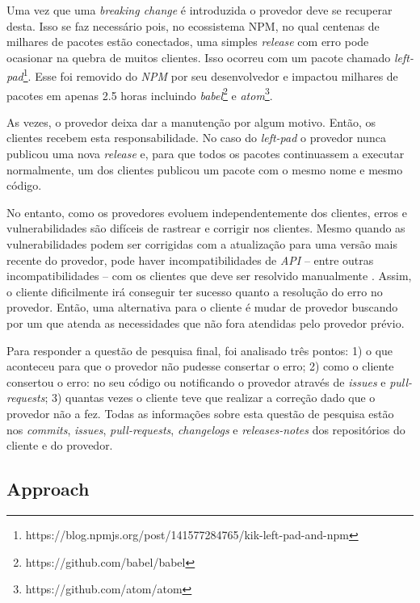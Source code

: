 Uma vez que uma \textit{breaking change} é introduzida o provedor deve se recuperar desta. Isso se faz necessário pois, no ecossistema \gls{NPM}, no qual centenas de milhares de pacotes estão conectados, uma simples \textit{release} com erro pode ocasionar na quebra de muitos clientes. Isso ocorreu com um pacote chamado \textit{left-pad}\footnote{https://blog.npmjs.org/post/141577284765/kik-left-pad-and-npm}. Esse foi removido do \textit{NPM} por seu desenvolvedor e impactou milhares de pacotes em apenas 2.5 horas incluindo \textit{babel}\footnote{https://github.com/babel/babel} e \textit{atom}\footnote{https://github.com/atom/atom}.

As vezes, o provedor deixa dar a manutenção por algum motivo. Então, os clientes recebem esta responsabilidade. No caso do \textit{left-pad} o provedor nunca publicou uma nova \textit{release} e, para que todos os pacotes continuassem a executar normalmente, um dos clientes publicou um pacote com o mesmo nome e mesmo código.

No entanto, como os provedores evoluem independentemente dos clientes, erros e vulnerabilidades são difíceis de rastrear e corrigir nos clientes. Mesmo quando as vulnerabilidades podem ser corrigidas com a atualização para uma versão mais recente do provedor, pode haver incompatibilidades de \textit{API} -- entre outras incompatibilidades -- com os clientes que deve ser resolvido manualmente \cite{Foo:2018:ESC:3236024.3275535}. Assim, o cliente dificilmente irá conseguir ter sucesso quanto a resolução do erro no provedor. Então, uma alternativa para o cliente é mudar de provedor buscando por um que atenda as necessidades que não fora atendidas pelo provedor prévio.

Para responder a questão de pesquisa final, foi analisado três pontos: 1) o que aconteceu para que o provedor não pudesse consertar o erro; 2) como o cliente consertou o erro: no seu código ou notificando o provedor através de \textit{issues} e \textit{pull-requests}; 3) quantas vezes o cliente teve que realizar a correção dado que o provedor não a fez. Todas as informações sobre esta questão de pesquisa estão nos \textit{commits}, \textit{issues}, \textit{pull-requests}, \textit{changelogs} e \textit{releases-notes} dos repositórios do cliente e do provedor.

\subsection{Approach}
\label{apr:rq3}

